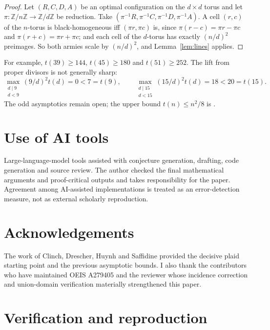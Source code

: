 \documentclass[11pt]{amsart}
\theoremstyle{definition}
\theoremstyle{remark}
\newcommand{\Z}{\mathbb{Z}}
\newcommand{\Zn}{\Z/n\Z}
\begin{document}
\begin{proof}
Let $(R,C,D,A)$ be an optimal configuration on the $d\times d$ torus and let $\pi:\Zn\to\Z/d\Z$ be reduction. Take $(\pi^{-1}R,\pi^{-1}C,\pi^{-1}D,\pi^{-1}A)$. A cell $(r,c)$ of the $n$-torus is black-homogeneous iff $(\pi r,\pi c)$ is, since $\pi(r-c)=\pi r-\pi c$ and $\pi(r+c)=\pi r+\pi c$; and each cell of the $d$-torus has exactly $(n/d)^2$ preimages. So both armies scale by $(n/d)^2$, and Lemma~\ref{lem:lines} applies.
\end{proof}

For example, $t(39)\ge144$, $t(45)\ge180$ and $t(51)\ge252$.  The lift from
proper divisors is not generally sharp:
\[
\max_{\substack{d\mid9\\d<9}}(9/d)^2t(d)=0<7=t(9),\qquad
\max_{\substack{d\mid15\\d<15}}(15/d)^2t(d)=18<20=t(15).
\]
The odd asymptotics remain open; the upper bound $t(n)\le n^2/8$ is
\cite[Thm.~1.4]{CDHS24}.

\section{Use of AI tools}\label{sec:ai}

Large-language-model tools assisted with conjecture generation, drafting,
code generation and source review.  The author checked the final mathematical
arguments and proof-critical outputs and takes responsibility for the paper.
Agreement among AI-assisted implementations is treated as an error-detection
measure, not as external scholarly reproduction.

\section*{Acknowledgements}

The work of Clinch, Drescher, Huynh and Saffidine provided the decisive plaid
starting point and the previous asymptotic bounds.  I also thank the
contributors who have maintained OEIS A279405 and the reviewer whose
incidence correction and union-domain verification materially strengthened
this paper.

\appendix

\section{Verification and reproduction}\label{app:verify}

\sloppy
\end{document}

